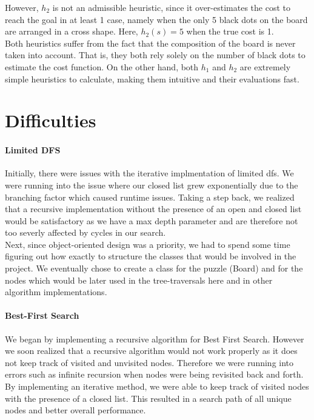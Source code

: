 \documentclass[runningheads]{llncs}
\begin{document}
However, $h_2$ is not an admissible heuristic, since it over-estimates the cost to reach the goal in at least 1 case, namely when the only 5 black dots on the board are arranged in a cross shape. Here, $h_2(s) = 5$ when the true cost is 1. \\

Both heuristics suffer from the fact that the composition of the board is never taken into account. That is, they both rely solely on the number of black dots to estimate the cost function. On the other hand, both $h_1$ and $h_2$ are extremely simple heuristics to calculate, making them intuitive and their evaluations fast. \\

\section{Difficulties}

\paragraph{Limited DFS} Initially, there were issues with the iterative implmentation of limited dfs. We were running into the issue where our closed list grew exponentially due to the branching factor which caused runtime issues. Taking a step back, we realized that a recursive implementation without the presence of an open and closed list would be satisfactory as we have a max depth parameter and are therefore not too severly affected by cycles in our search. \\

Next, since object-oriented design was a priority, we had to spend some time figuring out how exactly to structure the classes that would be involved in the project. We eventually chose to create a class for the puzzle (Board) and for the nodes which would be later used in the tree-traversals here and in other algorithm implementations.

\paragraph{Best-First Search} We began by implementing a recursive algorithm for Best First Search. However we soon realized that a recursive algorithm would not work properly as it does not keep track of visited and unvisited nodes. Therefore we were running into errors such as infinite recursion when nodes were being revisited back and forth. By implementing an iterative method, we were able to keep track of visited nodes with the presence of a closed list. This resulted in a search path of all unique nodes and better overall performance.
\end{document}
